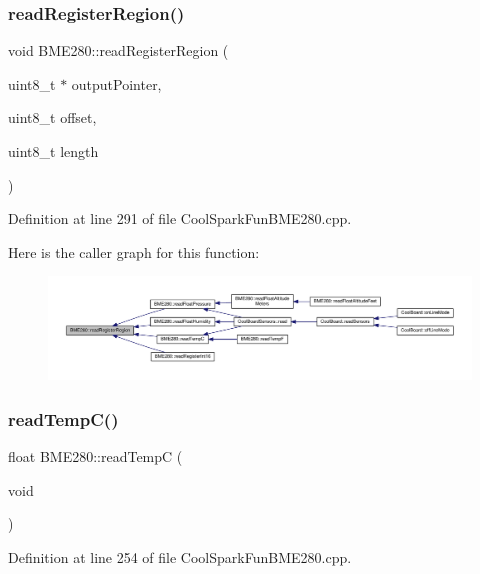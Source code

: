 \subsubsection{\texorpdfstring{read\+Register\+Region()}{readRegisterRegion()}}
{\footnotesize\ttfamily void B\+M\+E280\+::read\+Register\+Region (\begin{DoxyParamCaption}\item[{uint8\+\_\+t $\ast$}]{output\+Pointer,  }\item[{uint8\+\_\+t}]{offset,  }\item[{uint8\+\_\+t}]{length }\end{DoxyParamCaption})}



Definition at line 291 of file Cool\+Spark\+Fun\+B\+M\+E280.\+cpp.

Here is the caller graph for this function\+:\nopagebreak
\begin{figure}[H]
\begin{center}
\leavevmode
\includegraphics[width=350pt]{class_b_m_e280_aecca87c2c40a7f2bcabcea921bdc6124_icgraph}
\end{center}
\end{figure}
\mbox{\label{class_b_m_e280_afffdd1d7ded9e1f92200e70669019d97}} 
\subsubsection{\texorpdfstring{read\+Temp\+C()}{readTempC()}}
{\footnotesize\ttfamily float B\+M\+E280\+::read\+TempC (\begin{DoxyParamCaption}\item[{void}]{ }\end{DoxyParamCaption})}



Definition at line 254 of file Cool\+Spark\+Fun\+B\+M\+E280.\+cpp.

